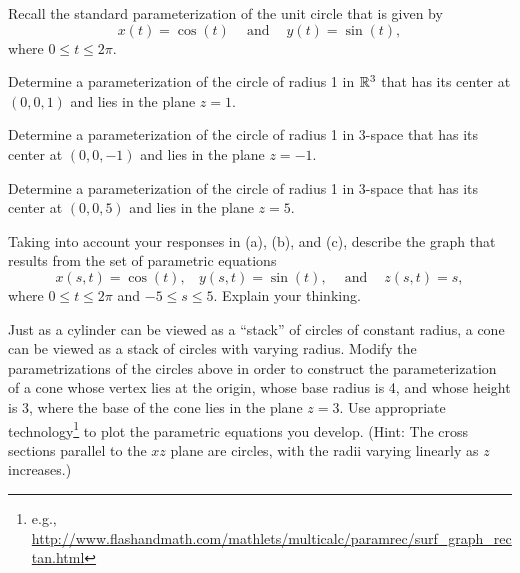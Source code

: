 \begin{pa} \label{PA:11.6} Recall the standard parameterization of the unit circle that is given by
\[x(t) = \cos(t) \ \ \ \ \text{ and } \ \ \ \ y(t) = \sin(t),\]
where $0 \le t \le 2\pi$.
    \ba
        \item Determine a parameterization of the circle of radius 1 in $\mathbb{R}^3$ that has its center at $(0,0,1)$ and lies in the plane $z=1$.

        \item Determine a parameterization of the circle of radius 1 in 3-space that has its center at $(0,0,-1)$ and lies in the plane $z=-1$.

        \item Determine a parameterization of the circle of radius 1 in 3-space that has its center at $(0,0,5)$ and lies in the plane $z=5$.

        \item Taking into account your responses in (a), (b), and (c), describe the graph that results from the set of parametric equations
        \[x(s,t) = \cos(t), \ \ \ \ y(s,t) = \sin(t), \ \ \ \ \text{ and } \ \ \ \ z(s,t) = s,\]
        where $0 \le t \le 2\pi$ and $-5 \le s \le 5$.         Explain your thinking.


    \item Just as a cylinder can be viewed as a ``stack'' of circles of constant radius, a cone can be viewed as a stack of circles with varying radius.  Modify the parametrizations of the circles above in order to construct the parameterization of a cone whose vertex lies at the origin, whose base radius is 4, and whose height is 3, where the base of the cone lies in the plane $z = 3$. Use appropriate technology\footnote{e.g., \url{http://www.flashandmath.com/mathlets/multicalc/paramrec/surf_graph_rectan.html}} to plot the parametric equations you develop. (Hint: The cross sections parallel to the $xz$ plane are circles, with the radii varying linearly as $z$ increases.)


    \ea
 
\end{pa} 
  
